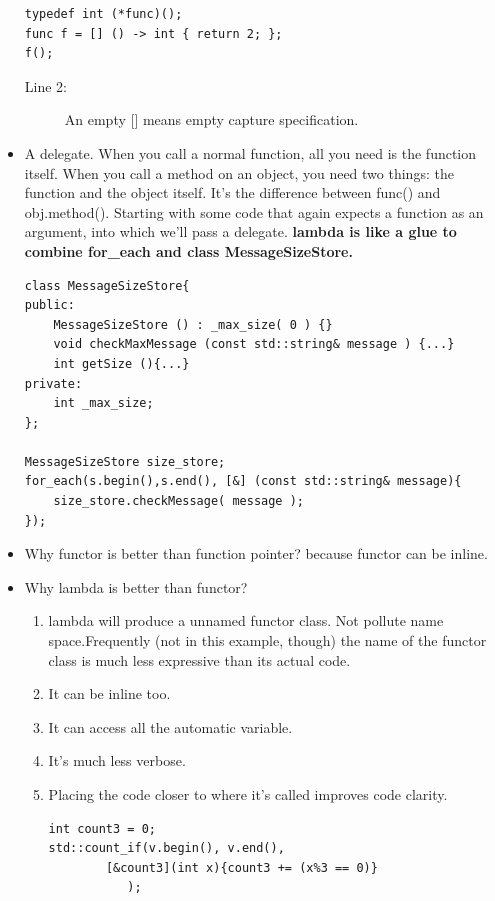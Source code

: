 \documentclass[a4paper,11pt,twoside]{book}
\begin{document}
\begin{itemize}
\begin{lstlisting}[numbers=none]
typedef int (*func)();
func f = [] () -> int { return 2; };
f();
\end{lstlisting}
\begin{description}
	\item[Line 2:] An empty [] means empty capture specification.
\end{description}

\item A delegate. When you call a normal function, all you need is the function itself. When you call a method on an object, you need two things: the function and the object itself. It's the difference between func() and obj.method(). Starting with some code that again expects a function as an argument, into which we'll pass a delegate. \textbf{lambda is like a glue to combine for\_each and class MessageSizeStore.}

\begin{lstlisting}[numbers=none]
class MessageSizeStore{
public:
    MessageSizeStore () : _max_size( 0 ) {}
    void checkMaxMessage (const std::string& message ) {...}
    int getSize (){...}
private:
    int _max_size;
};

MessageSizeStore size_store;
for_each(s.begin(),s.end(), [&] (const std::string& message){
	size_store.checkMessage( message );
});
\end{lstlisting}

\item Why functor is better than function pointer? because functor can be inline. 

\item Why lambda is better than functor? 
	\begin{enumerate}
		\item lambda will produce a unnamed functor class. Not pollute name space.Frequently (not in this example, though) the name of the functor class is much less expressive than its actual code.
		\item It can be inline too.
		\item It can access all the automatic variable.
		\item It's much less verbose.
		\item Placing the code closer to where it's called improves code clarity.
\begin{lstlisting}[numbers=none]
int count3 = 0;
std::count_if(v.begin(), v.end(), 
		[&count3](int x){count3 += (x%3 == 0)} 
		   );
\end{lstlisting}
	\end{enumerate}
\end{itemize}
\end{document}
